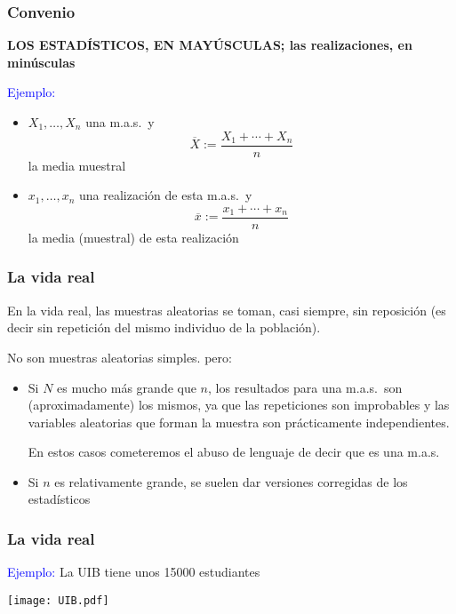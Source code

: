 \documentclass[12pt,t]{beamer}
\newcommand{\blue}[1]{\textcolor{blue}{#1}}
\renewcommand{\emph}[1]{{\color{red}#1}}
\theoremstyle{plain}
\theoremstyle{definition}
\begin{document}
\begin{frame}
\frametitle{Convenio}

\emph{\bf LOS ESTADÍSTICOS, EN MAYÚSCULAS; las realizaciones, en minúsculas}
\medskip

\blue{Ejemplo:} 
\begin{itemize}
\item $X_1,\ldots,X_n$ una m.a.s.\ y 
$$
\overline{X}:=\frac{X_1+\cdots+X_n}{n}
$$
la media muestral\medskip


\item $x_1,\ldots,x_n$ una realización  de esta  m.a.s.\ y 
$$
\overline{x}:=\frac{x_1+\cdots+x_n}{n}
$$
la media (muestral) de esta realización
\end{itemize}

\end{frame}




\begin{frame}
\frametitle{La vida real}

En la vida real, las muestras aleatorias se toman, casi siempre, sin reposición (es decir sin repetición del mismo individuo de la población).

No son muestras aleatorias simples. pero:
\begin{itemize}
\item Si $N$ es mucho más grande que $n$,  los resultados para una   m.a.s.\ son  (aproximadamente) los mismos,  ya que las  repeticiones son improbables y las variables aleatorias que forman la muestra son prácticamente  independientes.
\smallskip

En estos casos cometeremos el abuso de lenguaje  de decir que es una m.a.s.

\medskip

\item Si $n$ es relativamente grande, se suelen dar  versiones corregidas de los estadísticos
\end{itemize}

\end{frame}


\begin{frame}
\frametitle{La vida real}

\blue{Ejemplo:} La UIB tiene unos 15000 estudiantes





\begin{center}
\texttt{[image: UIB.pdf]}
\end{center}

\end{frame}
\end{document}
